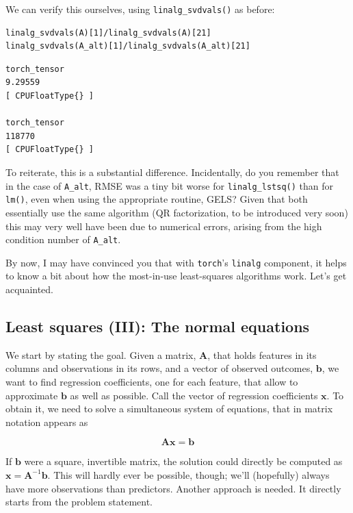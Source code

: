 \documentclass[
  letterpaper,
]{krantz}
\begin{document}
We can verify this ourselves, using \texttt{linalg\_svdvals()} as
before:

\begin{verbatim}
linalg_svdvals(A)[1]/linalg_svdvals(A)[21]
linalg_svdvals(A_alt)[1]/linalg_svdvals(A_alt)[21]
\end{verbatim}

\begin{verbatim}
torch_tensor
9.29559
[ CPUFloatType{} ]

torch_tensor
118770
[ CPUFloatType{} ]
\end{verbatim}

To reiterate, this is a substantial difference. Incidentally, do you
remember that in the case of \texttt{A\_alt}, RMSE was a tiny bit worse
for \texttt{linalg\_lstsq()} than for \texttt{lm()}, even when using the
appropriate routine, GELS? Given that both essentially use the same
algorithm (QR factorization, to be introduced very soon) this may very
well have been due to numerical errors, arising from the high condition
number of \texttt{A\_alt}.

By now, I may have convinced you that with \texttt{torch}'s
\texttt{linalg} component, it helps to know a bit about how the
most-in-use least-squares algorithms work. Let's get acquainted.

\hypertarget{least-squares-iii-the-normal-equations}{%
\subsection{\texorpdfstring{Least squares (III): The normal
equations}{Least squares (III): The normal equations}}\label{least-squares-iii-the-normal-equations}}

We start by stating the goal. Given a matrix, \(\mathbf{A}\), that holds
features in its columns and observations in its rows, and a vector of
observed outcomes, \(\mathbf{b}\), we want to find regression
coefficients, one for each feature, that allow to approximate
\(\mathbf{b}\) as well as possible. Call the vector of regression
coefficients \(\mathbf{x}\). To obtain it, we need to solve a
simultaneous system of equations, that in matrix notation appears as

\[
\mathbf{Ax} = \mathbf{b}
\]

If \(\mathbf{b}\) were a square, invertible matrix, the solution could
directly be computed as \(\mathbf{x} = \mathbf{A}^{-1}\mathbf{b}\). This
will hardly ever be possible, though; we'll (hopefully) always have more
observations than predictors. Another approach is needed. It directly
starts from the problem statement.
\end{document}
